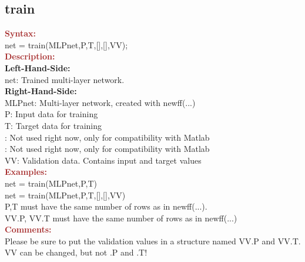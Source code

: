 \subsection{train}

\noindent \textbf{\textcolor{brown}{Syntax:}}\\

\noindent net = train(MLPnet,P,T,[],[],VV);\\

\noindent \textbf{\textcolor{brown}{Description:}}\\

\noindent  \textbf{Left-Hand-Side:}\\
\noindent net: Trained multi-layer network.\\

\noindent  \textbf{Right-Hand-Side:}\\
\noindent MLPnet: Multi-layer network, created with newff(...)\\ 
\noindent P: Input data for training\\ 
\noindent T: Target data for training\\
\noindent []: Not used right now, only for compatibility with Matlab\\
\noindent []: Not used right now, only for compatibility with Matlab\\
\noindent VV: Validation data. Contains input and target values\\

\noindent \textbf{\textcolor{brown}{Examples:}}\\

\noindent net = train(MLPnet,P,T)\\
\noindent net = train(MLPnet,P,T,[],[],VV)\\

\noindent P,T must have the same number of rows as in newff(...).\\
\noindent VV.P, VV.T must have the same number of rows as in newff(...)\\

\noindent \textbf{\textcolor{brown}{Comments:}}\\
\noindent Please be sure to put the validation values in a structure named
VV.P and VV.T.\\
VV can be changed, but not .P and .T!



